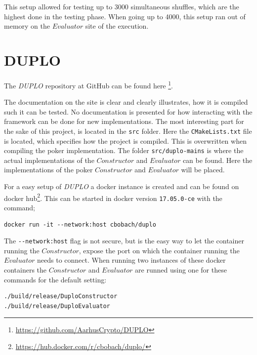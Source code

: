 \documentclass[twoside,11pt,openright]{report}
\newcommand{\DUPLO}{\textit{DUPLO} }
\begin{document}
\begin{appendices}
This setup allowed for testing up to 3000 simultaneous shuffles, which are the highest done in the testing phase. When going up to 4000, this setup ran out of memory on the $Evaluator$ site of the execution.


\section{DUPLO}
\label{app:duplo}
The \DUPLO repository at GitHub can be found here \footnote{\url{https://github.com/AarhusCrypto/DUPLO}}.

The documentation on the site is clear and clearly illustrates, how it is compiled such it can be tested. No documentation is presented for how interacting with the framework can be done for new implementations. The most interesting part for the sake of this project, is located in the \verb|src| folder. Here the \verb|CMakeLists.txt| file is located, which specifies how the project is compiled. This is overwritten when compiling the poker implementation. The folder \verb|src/duplo-mains| is where the actual implementations of the $Constructor$ and $Evaluator$ can be found. Here the implementations of the poker $Constructor$ and $Evaluator$ will be placed.

\bigskip

For a easy setup of \DUPLO a docker instance is created and can be found on docker hub\footnote{\url{https://hub.docker.com/r/cbobach/duplo/}}. This can be started in docker version \verb|17.05.0-ce| with the command;

\begin{center}
\begin{verbatim}
docker run -it --network:host cbobach/duplo
\end{verbatim}
\end{center}

The \verb|--network:host| flag is not secure, but is the easy way to let the container running the $Constructor$, expose the port on which the container running the $Evaluator$ needs to connect. When running two instances of these docker containers the $Constructor$ and $Evaluator$ are runned using one for these commands for the default setting:

\begin{center}
\begin{verbatim}
./build/release/DuploConstructor 
./build/release/DuploEvaluator
\end{verbatim}
\end{center}



\end{appendices}
\end{document}
